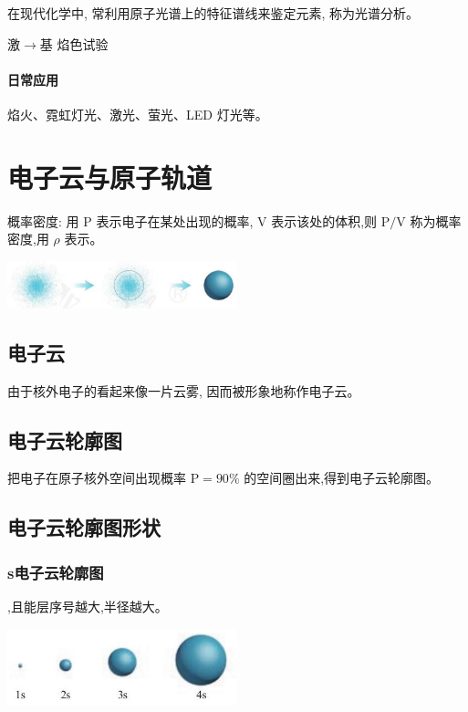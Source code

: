 \documentclass[10pt,cn]{elegantbook}
\begin{document}
	在现代化学中, 常利用原子光谱上的特征谱线来鉴定元素, 称为光谱分析。
	
	激$\rightarrow$基  焰色试验
	\subsubsection*{日常应用}
	
	 焰火、霓虹灯光、激光、萤光、LED 灯光等。
	 
\chapter{电子云与原子轨道}
	 
	 概率密度: 用 \(\mathrm{P}\) 表示电子在某处出现的概率, \(\mathrm{V}\) 表示该处的体积,则 \(\mathrm{P}/\mathrm{V}\) 称为概率密度,用 \(\rho\) 表示。
	 
	 	\begin{center}
	 	\includegraphics[max width=0.5\textwidth]{image/c51-1.jpg}
	 \end{center}
	 \section{电子云 }
	 
	 由于核外电子的看起来像一片云雾, 因而被形象地称作电子云。
	 
	 \section{电子云轮廓图}
	 
	 把电子在原子核外空间出现概率 \(\mathrm{P} = {90}\%\) 的空间圈出来,得到电子云轮廓图。 
	 
	 \section{电子云轮廓图形状}
	 
	\subsection{s电子云轮廓图}
	
	 ,且能层序号越大,半径越大。
	 
	 	\begin{center}
	 	\includegraphics[max width=0.5\textwidth]{image/c51-2.jpg}
	 \end{center}
	 
\end{document}

